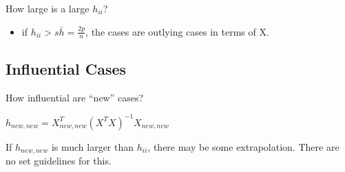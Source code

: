 \documentclass[11pt]{article}
\begin{document}
How large is a large \(h_{ii}\)?
\begin{itemize}
\item if \(h_{ii} > s\bar{h} = \frac{2p}{n}\), the cases are outlying cases in terms
of X.
\end{itemize}

\subsection{Influential Cases}
\label{sec:org271d498}

How influential are ``new'' cases?

\(h_{new,new} = X_{new,new}^T (X^T X)^{-1} X_{new,new}\)

If \(h_{new,new}\) is much larger than \(h_{ii}\), there may be some extrapolation.
There are no set guidelines for this.
\end{document}
